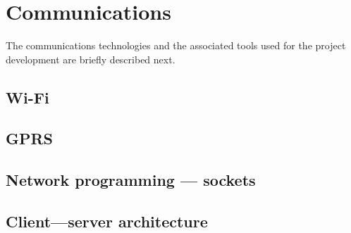 \section{Communications}
The communications technologies and the associated tools used for the project development are briefly described next.
%

%
\subsection{Wi-Fi}%
\label{sec:gprs}
\subsection{GPRS}%
\label{sec:gprs}
%
\subsection{Network programming --- sockets}%
\label{sec:netw-progr-sock}
%
\subsection{Client---server architecture}%
\label{sec:client-serv-arch}
